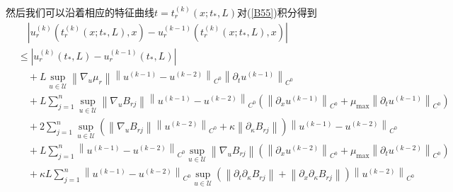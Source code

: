 \documentclass[notitlepage,cs4size,punct,oneside]{ctexrep}
\numberwithin{equation}{chapter}
\theoremstyle{mystyle}
\begin{document}
然后我们可以沿着相应的特征曲线$t=t_{r}^{(k)}\left(x ; t_{*}, L\right)$对(\ref{B55})积分得到
\begin{align}
     & \quad\left|u_{r}^{(k)}\left(t_{r}^{(k)}\left(x ; t_{*}, L\right), x\right)-u_{r}^{(k-1)}\left(t_{r}^{(k)}\left(x ; t_{*}, L\right), x\right)\right| \nonumber                                                                                                                                                                                 \\
     & \leq\left|u_{r}^{(k)}\left(t_{*}, L\right)-u_{r}^{(k-1)}\left(t_{*}, L\right)\right|\nonumber                                                                                                                                                                                                                                                 \\
     & \quad+L \sup _{u \in \mathcal{U}}\left\|\nabla_{u} \mu_{r}\right\|\left\|u^{(k-1)}-u^{(k-2)}\right\|_{C^{0}}\left\|\partial_{t} u^{(k-1)}\right\|_{C^{0}}\nonumber                                                                                                                                                                            \\
     & \quad+L \sum_{j=1}^{n} \sup _{u \in \mathcal{U}}\left\|\nabla_{u} B_{r j}\right\|\left\|u^{(k-1)}-u^{(k-2)}\right\|_{C^{0}}\left(\left\|\partial_{x} u^{(k-1)}\right\|_{C^{0}}+\mu_{\max }\left\|\partial_{t} u^{(k-1)}\right\|_{C^{0}}\right)\nonumber                                                                                       \\
     & \quad+2 \sum_{j=1}^{n} \sup _{u \in \mathcal{U}}\left( \left\|\nabla_{u} B_{r j}\right\|\left\|u^{(k-2)}\right\|_{C^{0}} + \kappa \left\| \partial_{\kappa }B_{rj} \right\|\right) \left\|u^{(k-1)}-u^{(k-2)}\right\|_{C^{0}}\nonumber                                                                                                        \\
     & \quad+L \sum_{j=1}^{n}\left\|u^{(k-1)}-u^{(k-2)}\right\|_{C^{0}} \sup _{u \in \mathcal{U}}  \left\|\nabla_{u} B_{r j}\right\|  \left(\left\|\partial_{x} u^{(k-2)}\right\|_{C^{0}}+\mu_{\max }\left\|\partial_{t} u^{(k-2)}\right\|_{C^{0}}\right)\nonumber                                                                                   \\
     & \quad+\kappa L \sum_{j=1}^{n}\left\|u^{(k-1)}-u^{(k-2)}\right\|_{C^{0}} \sup _{u \in \mathcal{U}} \left( \left\| \partial_t \partial_{\kappa } B_{r j}\right\| + \left\| \partial_x \partial_{\kappa } B_{r j}\right\| \right)\left\| u^{(k-2)}\right\|_{C^{0}}\nonumber                                                                      \\

\end{align}
\end{document}
